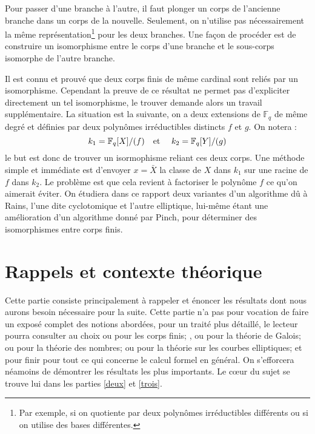 \documentclass[a4paper]{article} %
\numberwithin{section}{part}
\numberwithin{equation}{section}
\newcommand\GF[1]{\mathbb{F}_{#1}}
\newcommand\etmath{\textup{\quad et \quad}}
\begin{document}
Pour passer d'une branche à l'autre, il faut plonger un corps de l'ancienne
branche dans un corps de la nouvelle. Seulement, on n'utilise pas nécessairement
la même représentation\footnote{Par exemple, si on quotiente par deux polynômes
irréductibles différents ou si on utilise des bases différentes.} pour les deux 
branches. Une façon de procéder est de construire un isomorphisme entre le corps
d'une branche et le sous-corps isomorphe de l'autre branche.\par
Il est connu et prouvé que deux corps finis de même cardinal sont reliés par
un isomorphisme. Cependant la preuve de ce résultat ne permet pas d'expliciter
directement un tel isomorphisme, le trouver demande alors un travail 
supplémentaire. La situation est la suivante, on a deux extensions de 
$\GF{q}$ de même degré et définies par deux polynômes irréductibles distincts 
$f$ et $g$. On notera :
\[k_1=\GF{q}[X]/(f)\etmath k_2=\GF{q}[Y]/(g)\]
le but est donc de trouver un isormophisme reliant ces deux corps. 
Une méthode simple et immédiate est d'envoyer $x = \bar{X}$ la classe de $X$
dans $k_1$ sur une racine de $f$ dans $k_2$. Le problème est que cela revient à 
factoriser le polynôme $f$ ce qu'on aimerait éviter. On étudiera dans ce
rapport deux variantes d'un algorithme dû à Rains\cite{Rai}, l'une dite 
cyclotomique et l'autre elliptique, lui-même étant une amélioration d'un 
algorithme donné par Pinch\cite{Pin}, pour déterminer des isomorphismes entre 
corps finis.

\newpage
\tableofcontents
\newpage

\part{Rappels et contexte théorique}
\label{un}

Cette partie consiste principalement à rappeler et énoncer les résultats dont
nous aurons besoin nécessaire pour la suite. Cette partie n'a pas pour 
vocation de faire un exposé complet des notions abordées, pour un traité plus 
détaillé, le lecteur pourra consulter au choix \cite{LiNi1} ou 
\cite[chap.~III]{Per} pour les corps finis; \cite[chap.~VI]{Sam}, \cite{Lan1} ou
\cite{Esc} pour la théorie de Galois; \cite{Sam} ou \cite{Lan2} pour la théorie 
des nombres; \cite{Sil} ou \cite{Was2} pour la théorie sur les courbes 
elliptiques; et pour finir \cite{GaGe} pour tout ce qui concerne le calcul 
formel en général. On s'efforcera néamoins de démontrer les résultats les plus 
importants. Le c\oe{}ur du sujet se trouve lui dans les parties \ref{deux} et 
\ref{trois}.
\end{document}

